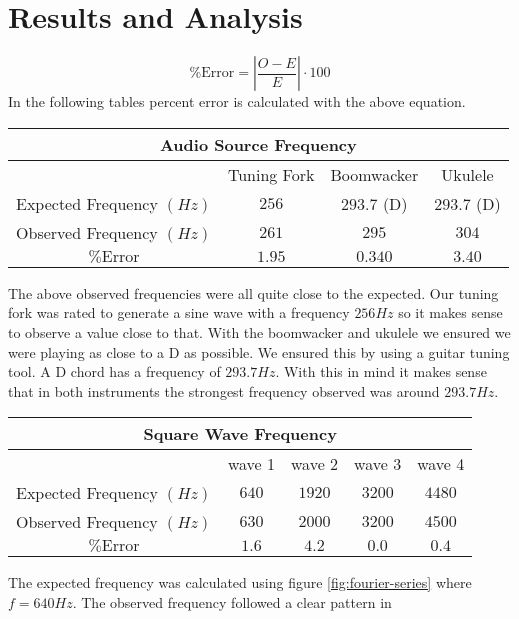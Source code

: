 \documentclass{article}
\newcommand{\pError}[0]{\ensuremath{\% \text{Error}}}
\begin{document}
\section{Results and Analysis}
\begin{equation*}
  \pError = \left| \frac{O - E}{E} \right| \cdot 100
\end{equation*}
In the following tables percent error is calculated with the above equation. 
\begin{center}
  \begin{tabular}{ |c|c|c|c| }
    \multicolumn{4}{c}{Audio Source Frequency} \\
    \hline
    {} & Tuning Fork & Boomwacker & Ukulele \\
    \hline
    Expected Frequency $(\si{Hz})$ & $256$  & $293.7$ (D) & $293.7$ (D) \\
    Observed Frequency $(\si{Hz})$ & $261$  & $295$       & $304$ \\
    $\pError$                      & $1.95$ & $0.340$     & $3.40$ \\
    \hline
  \end{tabular}
\end{center}
The above observed frequencies were all quite close to the expected. Our tuning
fork was rated to generate a sine wave with a frequency $\num{256}{\si{Hz}}$ so
it makes sense to observe a value close to that. With the boomwacker and ukulele
we ensured we were playing as close to a D as possible. We ensured this by using
a guitar tuning tool. A D chord has a frequency of $\num{293.7}\si{Hz}$. With
this in mind it makes sense that in both instruments the strongest frequency
observed was around $\num{293.7}\si{Hz}$.
\begin{center}
  \begin{tabular}{|c|c|c|c|c|}
    \multicolumn{5}{c}{Square Wave Frequency} \\
    \hline
    {} & wave 1 & wave 2 & wave 3 & wave 4 \\
    \hline
    Expected Frequency $(\si{Hz})$
       & $640$ & $1920$ & $3200$ & $4480$ \\
    Observed Frequency $(\si{Hz})$
       & $630$ & $2000$ & $3200$ & $4500$ \\
    $\pError$
       & $1.6$ & $4.2$  & $0.0$  & $0.4$  \\
    \hline
  \end{tabular}
\end{center}
The expected frequency was calculated using figure \ref{fig:fourier-series}
where $f = \num{640}\si{Hz}$. The observed frequency followed a clear pattern in
\end{document}
